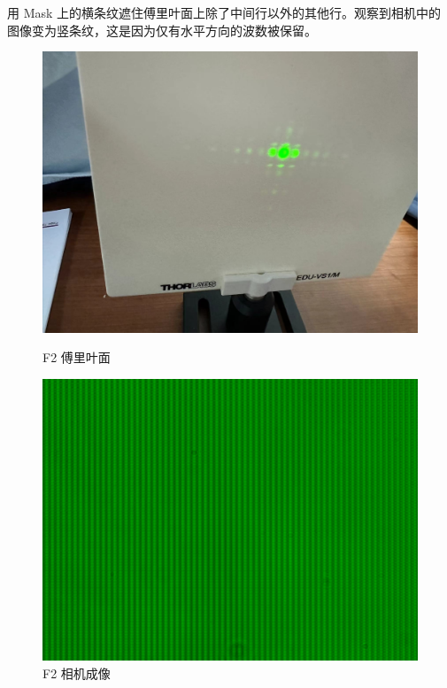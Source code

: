 \documentclass{ctexart}
\begin{document}
用 Mask 上的横条纹遮住傅里叶面上除了中间行以外的其他行。观察到相机中的图像变为竖条纹，这是因为仅有水平方向的波数被保留。
\begin{figure}[H]
  \centering
  \begin{minipage}[b]{0.2\textwidth}
    \centering
    \includegraphics[width=\textwidth]{pictures/微信图片_20241010201051.jpg}
    \caption{F2 傅里叶面}
  \end{minipage}
  \hspace{0.1\textwidth} %
  \begin{minipage}[b]{0.3\textwidth}
    \centering
    \includegraphics[width=\textwidth]{pictures/F2-mask-Ex8.png}
    \caption{F2 相机成像}
  \end{minipage}
\end{figure}
\end{document}
